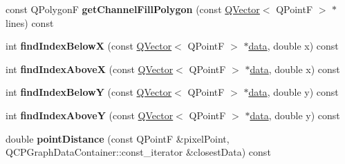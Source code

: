 \begin{DoxyCompactItemize}
\item 
const Q\+PolygonF {\bfseries get\+Channel\+Fill\+Polygon} (const \hyperlink{class_q_vector}{Q\+Vector}$<$ Q\+PointF $>$ $\ast$lines) const \hypertarget{class_q_c_p_graph_ab9f5bc0c2c98c90f287b4bbccf4944f6}{}\label{class_q_c_p_graph_ab9f5bc0c2c98c90f287b4bbccf4944f6}

\item 
int {\bfseries find\+Index\+BelowX} (const \hyperlink{class_q_vector}{Q\+Vector}$<$ Q\+PointF $>$ $\ast$\hyperlink{class_q_c_p_graph_a04514a2b1fb61a280ead66abe80b89ab}{data}, double x) const \hypertarget{class_q_c_p_graph_a6f4e9461d5925be9228fc4760249a04f}{}\label{class_q_c_p_graph_a6f4e9461d5925be9228fc4760249a04f}

\item 
int {\bfseries find\+Index\+AboveX} (const \hyperlink{class_q_vector}{Q\+Vector}$<$ Q\+PointF $>$ $\ast$\hyperlink{class_q_c_p_graph_a04514a2b1fb61a280ead66abe80b89ab}{data}, double x) const \hypertarget{class_q_c_p_graph_abab2a75b5e63630432bdd1f3b57f07fa}{}\label{class_q_c_p_graph_abab2a75b5e63630432bdd1f3b57f07fa}

\item 
int {\bfseries find\+Index\+BelowY} (const \hyperlink{class_q_vector}{Q\+Vector}$<$ Q\+PointF $>$ $\ast$\hyperlink{class_q_c_p_graph_a04514a2b1fb61a280ead66abe80b89ab}{data}, double y) const \hypertarget{class_q_c_p_graph_a6c4d556de3d1e02f548401001f72c6ff}{}\label{class_q_c_p_graph_a6c4d556de3d1e02f548401001f72c6ff}

\item 
int {\bfseries find\+Index\+AboveY} (const \hyperlink{class_q_vector}{Q\+Vector}$<$ Q\+PointF $>$ $\ast$\hyperlink{class_q_c_p_graph_a04514a2b1fb61a280ead66abe80b89ab}{data}, double y) const \hypertarget{class_q_c_p_graph_adf50243f1df203883a2187089734bfcb}{}\label{class_q_c_p_graph_adf50243f1df203883a2187089734bfcb}

\item 
double {\bfseries point\+Distance} (const Q\+PointF \&pixel\+Point, Q\+C\+P\+Graph\+Data\+Container\+::const\+\_\+iterator \&closest\+Data) const \hypertarget{class_q_c_p_graph_a619f22c55dffe9e6f380c5c79e3d9f0f}{}\label{class_q_c_p_graph_a619f22c55dffe9e6f380c5c79e3d9f0f}

\end{DoxyCompactItemize}
